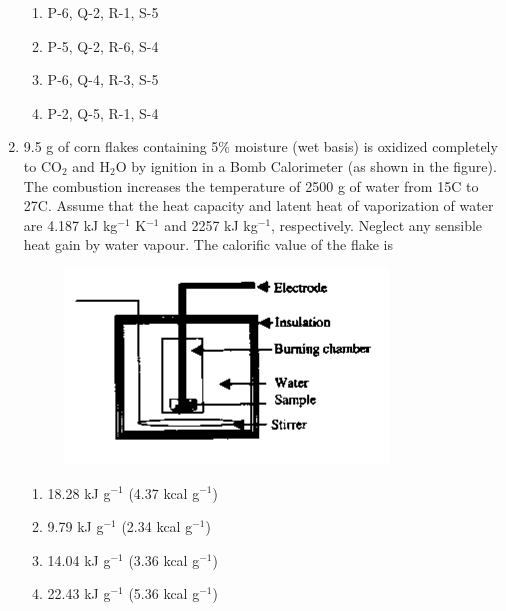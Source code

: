 \documentclass[a4paper,10pt]{article}
\begin{document}
\begin{enumerate}
\begin{multicols}{2}
\begin{enumerate}
\item P-6, Q-2, R-1, S-5
\item P-5, Q-2, R-6, S-4
\item P-6, Q-4, R-3, S-5
\item P-2, Q-5, R-1, S-4
\end{enumerate}
\end{multicols}

\item 9.5 g of corn flakes containing 5\% moisture (wet basis) is oxidized completely to CO$_2$ and H$_2$O by ignition in a Bomb Calorimeter (as shown in the figure). The combustion increases the temperature of 2500 g of water from 15\degree C to 27\degree C. Assume that the heat capacity and latent heat of vaporization of water are 4.187 kJ kg$^{-1}$ K$^{-1}$ and 2257 kJ kg$^{-1}$, respectively. Neglect any sensible heat gain by water vapour. The calorific value of the flake is
\begin{figure}[H]
    \centering
    \includegraphics[width=0.8\columnwidth]{Gq13.png}
    \caption*{}
    \label{fig:q13_food}
\end{figure}
\hfill{}

\begin{multicols}{2}
\begin{enumerate}
\item 18.28 kJ g$^{-1}$ (4.37 kcal g$^{-1}$)
\item 9.79 kJ g$^{-1}$ (2.34 kcal g$^{-1}$)
\item 14.04 kJ g$^{-1}$ (3.36 kcal g$^{-1}$)
\item 22.43 kJ g$^{-1}$ (5.36 kcal g$^{-1}$)
\end{enumerate}
\end{multicols}


\end{enumerate}
\end{document}
